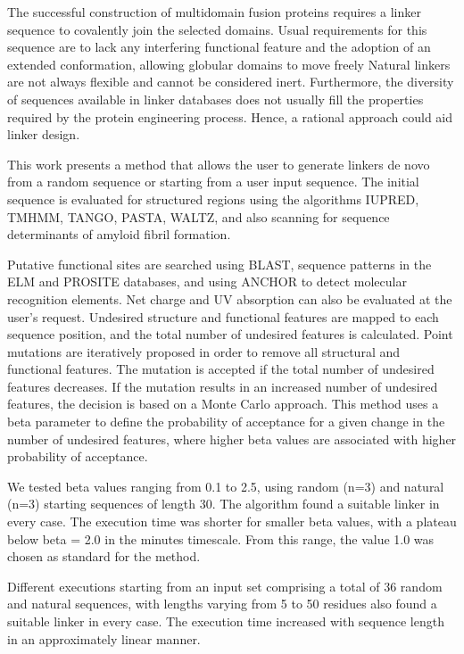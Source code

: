 

The successful construction of multidomain fusion proteins requires a linker sequence to covalently join the
selected domains. Usual requirements for this sequence are to lack any interfering functional feature and the
adoption of an extended conformation, allowing globular domains to move freely
Natural linkers are not always flexible and cannot be considered inert. Furthermore, the diversity of sequences
available in linker databases does not usually fill the properties required by the protein engineering process.
Hence, a rational approach could aid linker design.

This work presents a method that allows the user to generate linkers de novo from a random 
sequence or starting from a user input sequence.
The initial sequence is evaluated for structured regions using the algorithms IUPRED, TMHMM, TANGO, PASTA, WALTZ, 
and also scanning for sequence determinants of amyloid fibril formation. 

Putative functional sites are searched using BLAST, sequence patterns in the ELM and
PROSITE databases, and using ANCHOR to detect molecular recognition elements. 
Net charge and UV absorption can also be evaluated at the user’s request. 
Undesired structure and functional features are mapped to each sequence position, and the total number of undesired
features is calculated.
Point mutations are iteratively proposed in order to remove all structural and functional features. The mutation is
accepted if the total number of undesired features decreases. If the mutation results in an increased number of
undesired features, the decision is based on a Monte Carlo approach. This method uses a beta parameter to
define the probability of acceptance for a given change in the number of undesired features, where higher beta
values are associated with higher probability of acceptance.

We tested beta values ranging from 0.1 to 2.5, using random (n=3) and natural (n=3) starting sequences of length
30. The algorithm found a suitable linker in every case. The execution time was shorter for smaller beta values,
with a plateau below beta = 2.0 in the minutes timescale. 
From this range, the value 1.0 was chosen as standard for the method.

Different executions starting from an input set comprising a total of 36 random and natural sequences, with lengths
varying from 5 to 50 residues also found a suitable linker in every case. 
The execution time increased with sequence length in an approximately linear manner.

